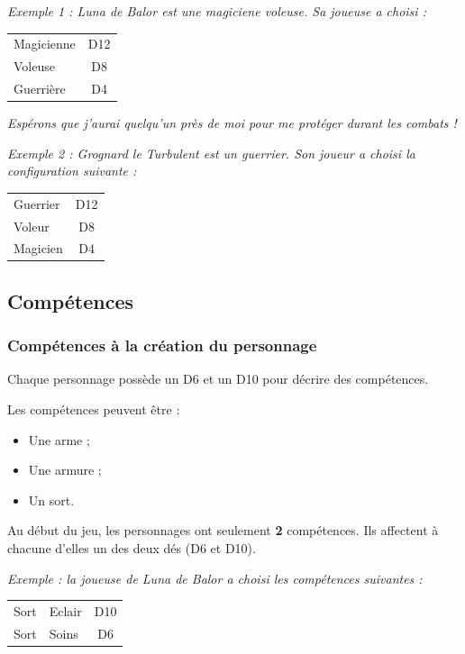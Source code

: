 \documentclass[a4paper, 11pt, twoside]{article}
\begin{document}
\emph{Exemple 1 : Luna de Balor est une magiciene voleuse. Sa joueuse a choisi :}

\begin{longtable}{l|c}
\hline
Magicienne & D12\\
Voleuse & D8\\
Guerrière & D4\\
\end{longtable}

\emph{Espérons que j'aurai quelqu'un près de moi pour me protéger durant les combats !}

\emph{Exemple 2 : Grognard le Turbulent est un guerrier. Son joueur a choisi la configuration suivante :}

\begin{longtable}{l|c}
\hline
Guerrier & D12\\
Voleur & D8\\
Magicien & D4\\
\end{longtable}


\subsection{Compétences}
\label{sec:org46b5f3f}
\subsubsection{Compétences à la création du personnage}
\label{sec:orgbb2298a}

Chaque personnage possède un D6 et un D10 pour décrire des compétences.

Les compétences peuvent être :
\begin{itemize}
\item Une arme ;
\item Une armure ;
\item Un sort.
\end{itemize}

Au début du jeu, les personnages ont seulement \textbf{2} compétences. Ils affectent à chacune d'elles un des deux dés (D6 et D10).

\emph{Exemple : la joueuse de Luna de Balor a choisi les compétences suivantes :}

\begin{longtable}{l|l|c}
\hline
Sort & Eclair & D10\\
Sort & Soins & D6\\
\end{longtable}
\end{document}
